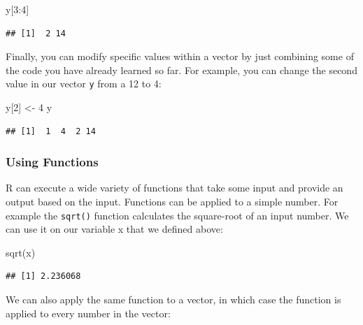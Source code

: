 \documentclass[
]{book}
\newenvironment{Shaded}{\begin{snugshade}}{\end{snugshade}}
\newcommand{\DecValTok}[1]{\textcolor[rgb]{0.00,0.00,0.81}{#1}}
\newcommand{\FunctionTok}[1]{\textcolor[rgb]{0.00,0.00,0.00}{#1}}
\newcommand{\NormalTok}[1]{#1}
\newcommand{\OtherTok}[1]{\textcolor[rgb]{0.56,0.35,0.01}{#1}}
\newcommand{\SpecialCharTok}[1]{\textcolor[rgb]{0.00,0.00,0.00}{#1}}
\begin{document}
\begin{Shaded}
\begin{Highlighting}[]
\NormalTok{y[}\DecValTok{3}\SpecialCharTok{:}\DecValTok{4}\NormalTok{]}
\end{Highlighting}
\end{Shaded}

\begin{verbatim}
## [1]  2 14
\end{verbatim}

Finally, you can modify specific values within a vector by just combining some of the code you have already learned so far. For example, you can change the second value in our vector \texttt{y} from a 12 to 4:

\begin{Shaded}
\begin{Highlighting}[]
\NormalTok{y[}\DecValTok{2}\NormalTok{] }\OtherTok{\textless{}{-}} \DecValTok{4}
\NormalTok{y}
\end{Highlighting}
\end{Shaded}

\begin{verbatim}
## [1]  1  4  2 14
\end{verbatim}

\hypertarget{using-functions}{%
\subsubsection*{Using Functions}\label{using-functions}}

R can execute a wide variety of functions that take some input and provide an output based on the input. Functions can be applied to a simple number. For example the \texttt{sqrt()} function calculates the square-root of an input number. We can use it on our variable x that we defined above:

\begin{Shaded}
\begin{Highlighting}[]
\FunctionTok{sqrt}\NormalTok{(x)}
\end{Highlighting}
\end{Shaded}

\begin{verbatim}
## [1] 2.236068
\end{verbatim}

We can also apply the same function to a vector, in which case the function is applied to every number in the vector:
\end{document}
